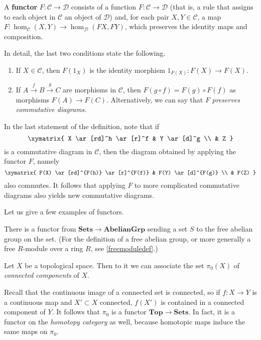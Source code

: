 \begin{definition} \label{covfunc}
A \textbf{functor} $F: \mathcal{C} \to \mathcal{D}$ consists of a function $F:
\mathcal{C} \to  \mathcal{D}$ (that is, a rule that assigns to each object
in $\mathcal{C}$ an object of $\mathcal{D}$) and, for each pair $X, Y \in
\mathcal{C}$,
a map
$F: \hom_{\mathcal{C}}(X, Y) \to \hom_{\mathcal{D}}(FX, FY)$, which preserves
the identity
maps and composition.

In detail, the last two conditions state the following. 
\begin{enumerate}
\item  If $X \in
\mathcal{C}$, then $F(1_X)$ is the identity morphism $1_{F(X)}: F(X) \to
F(X)$.
\item  If $A \stackrel{f}{\to} B \stackrel{g}{\to} C$ are
morphisms in $\mathcal{C}$,
then $F(g \circ f) = F(g) \circ F(f)$ as morphisms $F(A) \to F(C)$.
Alternatively, we can say that $F$ \emph{preserves commutative diagrams.}
\end{enumerate}
\end{definition}

In the last statement of the definition, note that if 
\[ \xymatrix{
X \ar[rd]^h \ar[r]^f &  Y \ar[d]^g \\
 & Z
}\]
is a commutative diagram in $\mathcal{C}$, then the diagram obtained by
applying the functor $F$, namely
\[ \xymatrix{
F(X) \ar[rd]^{F(h)} \ar[r]^{F(f)} &  F(Y) \ar[d]^{F(g)} \\
 & F(Z)
}\]
also commutes. It follows that applying $F$ to more complicated commutative
diagrams also yields new commutative diagrams. 


Let us give a few examples of functors.

\begin{example}
There is a functor from $\mathbf{Sets} \to \mathbf{AbelianGrp}$ sending a set
$S$ to the free abelian group on the set. (For the definition of a free abelian
group, or more generally a free $R$-module over a ring $R$, see
\cref{freemoduledef}.)
\end{example}

\begin{example} \label{pi0}
Let $X$ be a topological space. Then to it we can associate the set $\pi_0(X)$
of \emph{connected components} of $X$. 

Recall that the continuous image of a
connected set is connected, so if $f: X \to Y$ is a continuous map and $X'
\subset X$ connected, $f(X')$ is contained in a connected component of $Y$. It
follows that $\pi_0$ is a functor $\mathbf{Top} \to \mathbf{Sets}$.
In fact, it is a functor on the \emph{homotopy category} as well, because
homotopic maps induce the same maps on $\pi_0$.
\end{example} 


